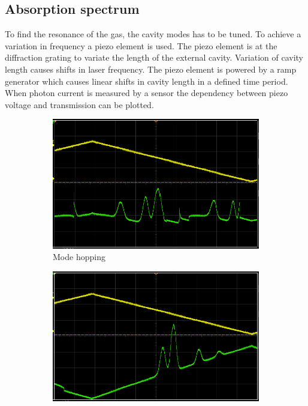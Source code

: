 \subsection{Absorption spectrum}%
\label{sub:absorbtion_spectrum}
To find the resonance of the gas, the cavity modes has to be tuned.
To achieve a variation in frequency a piezo element is used.
The piezo element is at the diffraction grating to variate the length of the
external cavity.
Variation of cavity length causes shifts in laser frequency.
The piezo element is powered by a ramp generator which causes linear shifts in
cavity length in a defined time period.
When photon current is measured by a sensor the dependency between piezo voltage and
transmission can be plotted.
\begin{figure}[h]
		\centering
		\begin{subfigure}[b]{0.49\textwidth}
				\begin{center}
				\includegraphics[width=1.0\linewidth]{./content/pictures/scope_136.png}
						\caption{Mode hopping}%
				\label{fig:piezotest}
				\end{center}
		\end{subfigure}
		\begin{subfigure}[b]{0.49\textwidth}
				\begin{center}
						\includegraphics[width=1.0\linewidth]{./content/pictures/scope_138.png}

\end{center}
\end{subfigure}
\end{figure}
